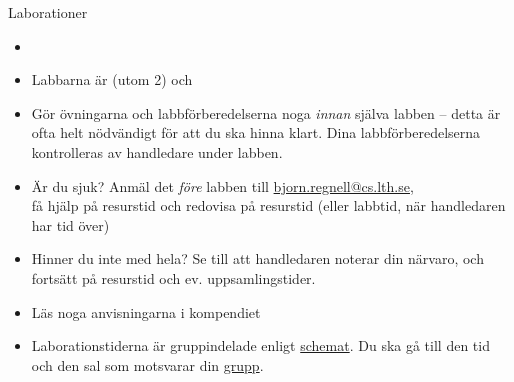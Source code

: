 \documentclass{lecturenotes}
\begin{document}

\begin{Slide}{Laborationer}\footnotesize
\begin{itemize}
\item {}
\item Labbarna är  (utom 2) och 
\item Gör övningarna och labbförberedelserna noga \textit{innan} själva labben -- detta är ofta helt nödvändigt för att du ska hinna klart. Dina labbförberedelserna kontrolleras av handledare under labben.
\item Är du sjuk? Anmäl det \textit{före} labben till \url{bjorn.regnell@cs.lth.se}, \\ få hjälp på resurstid och redovisa på resurstid (eller labbtid, när handledaren har tid över)
\item Hinner du inte med hela? Se till att handledaren noterar din närvaro, och fortsätt på resurstid och ev. uppsamlingstider.
\item Läs noga anvisningarna i kompendiet
\item Laborationstiderna är gruppindelade enligt \href{http://cs.lth.se/eda016/schema/}{schemat}. Du ska gå till den tid och den sal som motsvarar din \href{http://cs.lth.se/eda016/grupper/}{grupp}.
\end{itemize}
\end{Slide}
\end{document}
